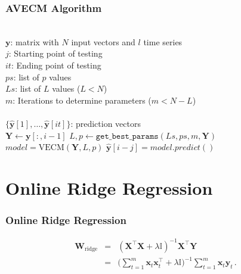 \documentclass{beamer}
\begin{document}
\begin{frame}
\frametitle{AVECM Algorithm}
\small
\begin{algorithmic}[1]
\REQUIRE $\,$ \\
$\mathbf{y}$: matrix with $N$ input vectors and $l$ time series\\
$j$: Starting point of testing \\
$it$: Ending point of testing \\
$ps$: list of $p$ values \\
$Ls$: list of $L$ values ($L<N$) \\
$m$: Iterations to determine parameters ($m < N-L$)\\
\ENSURE  $\,$ \\
$\{ \hat{\mathbf{y}}[1],\dots,\hat{\mathbf{y}}[it]\}$: prediction vectors \\
   \STATE $\mathbf{Y} \gets \mathbf{y}[:,i-1]$
    \STATE $L,p \gets
    \texttt{get\_best\_params}(Ls,ps,m,\mathbf{Y})$
        \STATE $model = \text{VECM}(\mathbf{Y},L, p)$
        \STATE $\hat{\mathbf{y}}[i-j] = model.predict()$
\ENDFOR
\end{algorithmic}
\end{frame}

\section{Online Ridge Regression}

\begin{frame}
\frametitle{Online Ridge Regression}
\begin{eqnarray*}
\label{eq:RReapand}
\mathbf{\mathbf{W}}_{\text{ridge}}&=&(\mathbf{X}^\top \mathbf{X}+ \lambda
\mathbb{I})^{-1}\mathbf{X}^\top \mathbf{Y} \\
&=& \displaystyle \big (\sum_{t=1}^m
\mathbf{x}_t \mathbf{x}_t  ^\top + \lambda \mathbb{I}\big )^{-1}
\sum_{t=1}^m \mathbf{x}_t \mathbf{y}_t \, .
\end{eqnarray*}
\end{frame}
\end{document}

